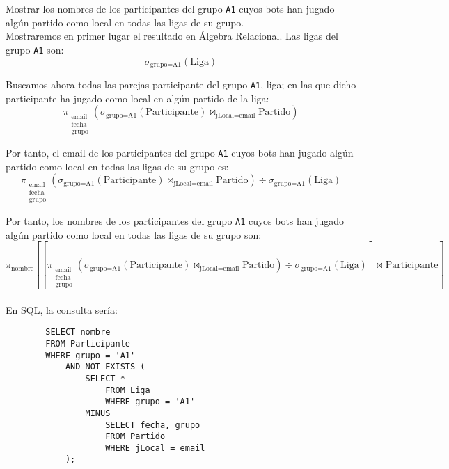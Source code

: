\documentclass[12pt]{article}
\begin{document}
\begin{ejercicio}[AR y SQL]
    Mostrar los nombres de los participantes del grupo \verb|A1| cuyos bots han jugado algún partido como local en todas las ligas de su grupo.\\

    Mostraremos en primer lugar el resultado en Álgebra Relacional. Las ligas del grupo \verb|A1| son:
    \[
        \sigma_{\text{grupo}=\text{A1}}(\text{Liga})
    \]

    Buscamos ahora todas las parejas participante del grupo \verb|A1|, liga; en las que dicho participante ha jugado como local en algún partido de la liga:
    \[
        \pi_{\substack{\text{email}\\ \text{fecha}\\ \text{grupo}}}\left(\sigma_{\text{grupo}=\text{A1}}(\text{Participante})\bowtie_{\text{jLocal}=\text{email}}\text{Partido}\right)
    \]

    Por tanto, el email de los participantes del grupo \verb|A1| cuyos bots han jugado algún partido como local en todas las ligas de su grupo es:
    \[
        \pi_{\substack{\text{email}\\ \text{fecha}\\ \text{grupo}}}\left(\sigma_{\text{grupo}=\text{A1}}(\text{Participante})\bowtie_{\text{jLocal}=\text{email}}\text{Partido}\right)
        \div \sigma_{\text{grupo}=\text{A1}}(\text{Liga})
    \]

    Por tanto, los nombres de los participantes del grupo \verb|A1| cuyos bots han jugado algún partido como local en todas las ligas de su grupo son:
    \[
        \pi_{\text{nombre}}\left[\left[\pi_{\substack{\text{email}\\ \text{fecha}\\ \text{grupo}}}\left(\sigma_{\text{grupo}=\text{A1}}(\text{Participante})\bowtie_{\text{jLocal}=\text{email}}\text{Partido}\right)
        \div \sigma_{\text{grupo}=\text{A1}}(\text{Liga})\right]\bowtie \text{Participante}\right]
    \]~\\

    En SQL, la consulta sería:
    \begin{verbatim}
        SELECT nombre
        FROM Participante
        WHERE grupo = 'A1'
            AND NOT EXISTS (
                SELECT *
                    FROM Liga
                    WHERE grupo = 'A1'
                MINUS
                    SELECT fecha, grupo
                    FROM Partido
                    WHERE jLocal = email
            );
    \end{verbatim}
\end{ejercicio}
\end{document}
